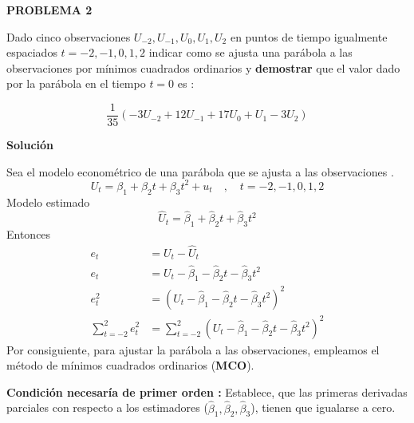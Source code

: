 \documentclass[10pt,a4paper, openany ]{book}
\begin{document}
  \pagecolor{pagecolor}
  \color{verdeclaro}
  \newpage
  \Large
  \begin{center}  
      \textbf{PROBLEMA 2}
  \end{center}
  \begin{center}
  \vspace{8mm}
  \justifying
      Dado cinco observaciones $U_{-2}, U_{-1}, U_{0},     U_{1},  U_{2} $ en puntos de tiempo igualmente espaciados $ t = -2, -1, 0, 1, 2 $  indicar como se ajusta una parábola a las observaciones por mínimos cuadrados ordinarios y \textbf{demostrar}  que el valor dado por la parábola en el tiempo $t = 0$ es :
  \end{center}   
  \begin{equation*}
      \dfrac{1}{35}(-3U_{-2}+12U_{-1}+17U_{0}+U_{1}-3U_{2})
  \end{equation*}
  \begin{center}
      \textbf{Solución}
  \end{center}
  Sea el modelo econométrico  de una parábola que se ajusta a las observaciones  . 
  \begin{equation*}
      U_{t} =\beta_{1}+\beta_{2}t+\beta_{3}t^{2}+ u_{t} \, \, \, \, \, \, , \, \, \, \, \, \,t = -2, -1, 0, 1, 2
  \end{equation*}
  \noindent Modelo estimado 
  \begin{equation*}
        \hat{U}_{t} =\hat{\beta}_{1}+\hat{\beta}_{2}t+\hat{\beta}_{3}t^{2} 
  \end{equation*}
  Entonces
  \begin{align*}
        e_{t} &= U_{t}-\hat{U}_{t} \\
        e_{t} &= U_{t}-\hat{\beta}_{1}-\hat{\beta}_2t-\hat{\beta}_{3}t^{2}\\
          e^{2}_{t} &= ( U_{t}-\hat{\beta}_{1}-\hat{\beta}_2t-\hat{\beta}_{3}t^{2} )^{2}\\
            \sum\limits_{t=-2}^{2}e^{2}_{t} &=  \sum\limits_{t=-2}^{2}( U_{t}-\hat{\beta}_{1}-\hat{\beta}_2t-\hat{\beta}_{3}t^{2} )^{2}
  \end{align*}
  Por consiguiente, para ajustar la parábola a las observaciones, empleamos el método de  mínimos cuadrados ordinarios (\textbf{MCO}).
  \begin{center}
  \justifying
  \textbf{Condición necesaría de primer orden :} Establece, que las primeras derivadas parciales con respecto a los estimadores ($\hat{\beta}_{1},\hat{\beta}_{2},\hat{\beta}_{3}$), tienen que igualarse a cero.    
  \end{center}
\end{document}
